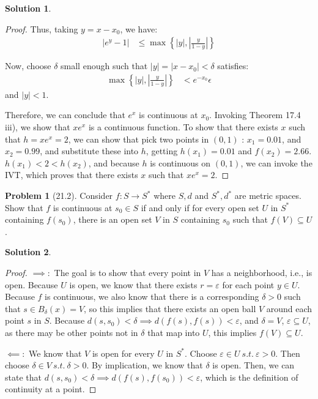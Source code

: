 \documentclass[12pt]{article}
\theoremstyle{definition} %
\newtheorem{solution}{Solution}
\newtheorem{problem}{Problem}
\theoremstyle{plain} %
\begin{document}
\begin{solution}
\begin{proof}
    Thus, taking \( y = x - x_0 \), we have:
    \begin{align}
    |e^y - 1| &\leq \max \left\{ |y|, \left| \frac{y}{1 - y} \right| \right\}
    \end{align}
    
    Now, choose \( \delta \) small enough such that \( |y| = |x - x_0| < \delta \) satisfies:
    \begin{align}
    \max \left\{ |y|, \left| \frac{y}{1 - y} \right| \right\} &< e^{-x_0} \epsilon
    \end{align}
    and \( |y| < 1 \).
    
    Therefore, we can conclude that \( e^x \) is continuous at \( x_0 \).
    \vspace{.5cm} 
    Invoking Theorem 17.4 iii), we show that \(xe^{x}\) is a continuous function. To show that there exists \(x\) such that \(h=xe^{x}=2\), we can show that pick two points in \((0,1)\) : \(x_1=0.01\), and \(x_2=0.99\), and substitute these into \(h\), getting \(h(x_1)=0.01\) and \(f(x_2)=2.66\). \(h(x_1)<2<h(x_2)\), and because \(h\) is continuous on \((0,1)\), we can invoke the IVT, which proves that there exists \(x\) such that \(xe^{x}=2\).  
  
  \end{proof}
\end{solution}
\begin{problem}[21.2]
    Consider \(f:S\to S^{*}\) where \(S,d\) and \(S^{*}, d^{*}\) are metric spaces. Show that \(f\) is continuous at \(s_{0}\in S \) if and only if for every open set \(U\) in \(S^{*} \) containing \(f(s_{0} )\), there is an open set \(V\) in \(S\) containing \(s_{0}\) such that \(f(V) \subseteq U\).
\end{problem}
\begin{solution}
\begin{proof}
  \(\implies:\) The goal is to show that every point in \(V\) has a neighborhood, i.e., is open. Because \(U\) is open, we know that there exists \(r=\varepsilon\) for each point \(y\in U\). Because \(f\) is continuous, we also know that there is a corresponding \(\delta>0\) such that \(s\in B_{\delta}(x)=V\), so this implies that there exists an open ball \(V\) around each point \(s\) in \(S\). Because \(d(s,s_0)<\delta \implies d(f(s),f(s))<\varepsilon\), and \(\delta = V\), \(\varepsilon \subseteq U\), as there may be other points not in \(\delta\) that map into \(U\), this implies \(f(V)\subseteq U\). 
  \vspace{.5cm}

  \(\impliedby:\) We know that \(V\) is open for every \(U\) in \(S^{*}\). Choose \(\varepsilon \in U \ s.t. \ \varepsilon >0\). Then choose \(\delta \in V \ s.t. \ \delta >0\). By implication, we know that \(\delta\) is open. Then, we can state that \(d(s, s_0)<\delta \implies d(f(s),f(s_0))<\varepsilon\), which is the definition of continuity at a point.    
\end{proof}
\end{solution}
\end{document}
